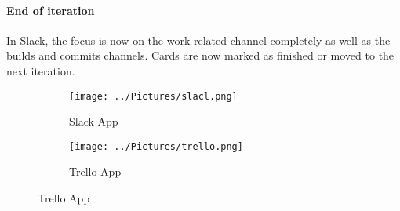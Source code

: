 \documentclass[a4wide, 10pt]{article}
\begin{document}
\paragraph{End of iteration}
In Slack, the focus is now on the work-related channel completely as well as the builds and commits channels.  Cards are now marked as finished or moved to the next iteration.
\begin{figure}[h]
\centering
\begin{subfigure}{.5\textwidth}
  \centering
	\texttt{[image: ../Pictures/slacl.png]}
  \caption{Slack App}
  \label{fig:sub1}
\end{subfigure}%
\begin{subfigure}{.5\textwidth}
  \centering
	\texttt{[image: ../Pictures/trello.png]}  
  \caption{Trello App}
  \label{fig:sub2}
\end{subfigure}
\label{fig:test}
\end{figure}
\end{document}
